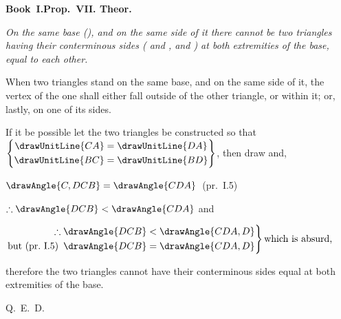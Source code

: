 \documentclass[12pt]{article}
\begin{document}
\noindent
\begin{minipage}[t]{0.45\linewidth}
\centering\vspace{0pt}%
\drawCurrentPicture
\end{minipage}\hfill
\begin{minipage}[t]{0.52\linewidth}
\vspace{0pt}%
\textbf{Book~I.\enspace Prop.\ VII. Theor.}

\medskip\noindent\itshape
On the same base (), and on the same side
of it there cannot be two triangles having their conterminous
sides ( and ,
 and ) at both extremities
of the base, equal to each other.

\bigskip

\noindent\upshape
When two triangles stand on the same base, and on the same
side of it, the vertex of the one shall either fall outside
of the other triangle, or within it; or, lastly, on one of
its sides.

\smallskip
If it be possible let the two triangles be constructed so
that
$\left\{\begin{aligned}
  \drawUnitLine{CA}&=\drawUnitLine{DA}\\
  \drawUnitLine{BC}&=\drawUnitLine{BD}
\end{aligned}\right\}$,
then draw  and,

\begin{center}
$\drawAngle{C,DCB} = \drawAngle{CDA}$~(pr.~I.5)

$\therefore \drawAngle{DCB} < \drawAngle{CDA}$ and

$\left.\begin{aligned}
  \therefore\drawAngle{DCB} &< \drawAngle{CDA,D}\\
  \text{but~(pr.~I.5)}\enspace\drawAngle{DCB}
    &= \drawAngle{CDA,D}
\end{aligned}\right\}\text{which is absurd,}$
\end{center}

\noindent
therefore the two triangles cannot have their conterminous
sides equal at both extremities of the base.

\begin{flushright}Q.\ E.\ D.\end{flushright}
\end{minipage}
\end{document}
